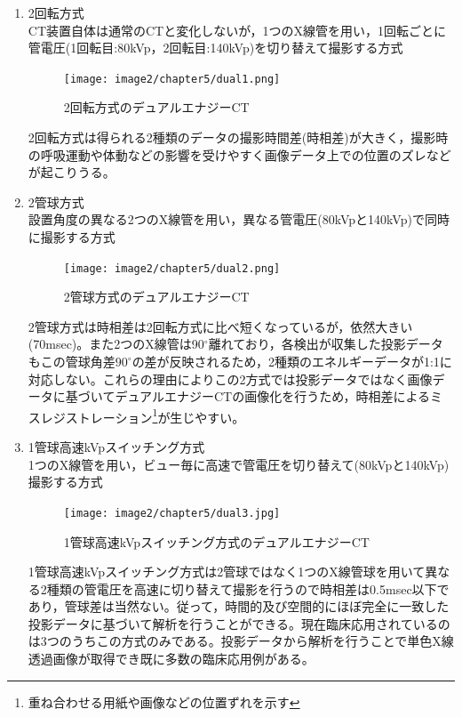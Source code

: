 \begin{enumerate}
\renewcommand{\labelenumi}{(\arabic{enumi})}
\item 2回転方式\\CT装置自体は通常のCTと変化しないが，1つのX線管を用い，1回転ごとに管電圧(1回転目:80kVp，2回転目:140kVp)を切り替えて撮影する方式
\begin{figure}[H]
 \begin{center}
 \texttt{[image: image2/chapter5/dual1.png]} 
 \end{center}
 \caption{2回転方式のデュアルエナジーCT}
 \label{fig:dual1}
\end{figure}

2回転方式は得られる2種類のデータの撮影時間差(時相差)が大きく，撮影時の呼吸運動や体動などの影響を受けやすく画像データ上での位置のズレなどが起こりうる。


\item 2管球方式\\設置角度の異なる2つのX線管を用い，異なる管電圧(80kVpと140kVp)で同時に撮影する方式


\begin{figure}[H]
 \begin{center}
 \texttt{[image: image2/chapter5/dual2.png]} 
 \end{center}
 \caption{2管球方式のデュアルエナジーCT}
 \label{fig:dual2}
\end{figure}
2管球方式は時相差は2回転方式に比べ短くなっているが，依然大きい(70msec)。また2つのX線管は90$^{\circ}$離れており，各検出が収集した投影データもこの管球角差$90^{\circ}$の差が反映されるため，2種類のエネルギーデータが1:1に対応しない。これらの理由によりこの2方式では投影データではなく画像データに基づいてデュアルエナジーCTの画像化を行うため，時相差によるミスレジストレーション\footnote{重ね合わせる用紙や画像などの位置ずれを示す}が生じやすい。

\item 1管球高速kVpスイッチング方式\\1つのX線管を用い，ビュー毎に高速で管電圧を切り替えて(80kVpと140kVp)撮影する方式


\begin{figure}[H]
 \begin{center}
 \texttt{[image: image2/chapter5/dual3.jpg]} 
 \end{center}
 \caption{1管球高速kVpスイッチング方式のデュアルエナジーCT}
 \label{fig:dual3}
\end{figure}

1管球高速kVpスイッチング方式は2管球ではなく1つのX線管球を用いて異なる2種類の管電圧を高速に切り替えて撮影を行うので時相差は0.5msec以下であり，管球差は当然ない。従って，時間的及び空間的にほぼ完全に一致した投影データに基づいて解析を行うことができる。現在臨床応用されているのは3つのうちこの方式のみである。投影データから解析を行うことで単色X線透過画像が取得でき既に多数の臨床応用例がある\cite{spectralCT}。


\end{enumerate}

